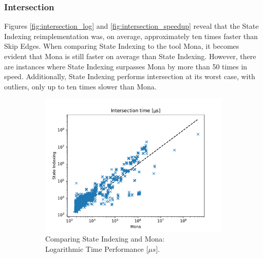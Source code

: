 \documentclass[pdflatex,sn-mathphys-num]{sn-jnl}%
\theoremstyle{thmstyleone}%
\theoremstyle{thmstyletwo}%
\theoremstyle{thmstylethree}%
\begin{document}
        \subsubsection*{Intersection}
            Figures \ref{fig:intersection_log} and \ref{fig:intersection_speedup} reveal that the State Indexing reimplementation was, on average, approximately ten times faster than Skip Edges. When comparing State Indexing to the tool Mona, it becomes evident that Mona is still faster on average than State Indexing. However, there are instances where State Indexing surpasses Mona by more than 50 times in speed. Additionally, State Indexing performs intersection at its worst case, with outliers, only up to ten times slower than Mona.
            \vspace*{-1em}
            \begin{figure}[h!]
                \centering
                \captionsetup[subfigure]{justification=centering}
                \begin{subfigure}{0.49\textwidth}
                    \includegraphics[width=\textwidth]{Figures/intersection-mona.pdf}
                    \caption*{Comparing State Indexing and Mona:\\ Logarithmic Time Performance [$\mu s$].}
                \end{subfigure}
                \begin{subfigure}{0.49\textwidth}

\end{subfigure}
\end{figure}
\end{document}
